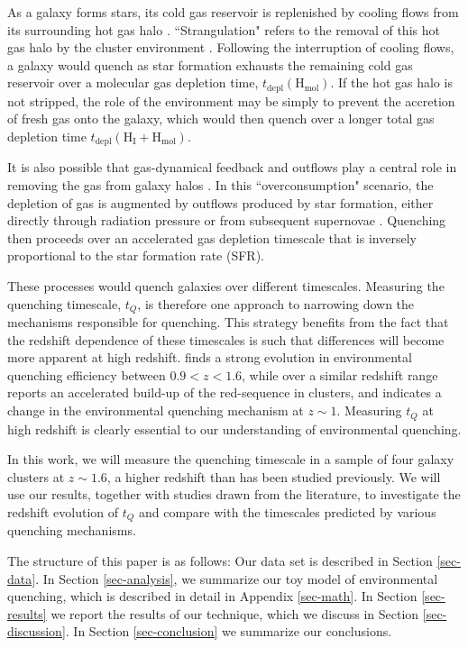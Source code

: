 As a galaxy forms stars, its cold gas reservoir is replenished by cooling flows from its surrounding hot gas halo \citep{Bauermeister:2010aa}.
``Strangulation" refers to the removal of this hot gas halo by the cluster environment \citep{Larson:1980aa,Merritt:1983aa,Byrd:1990aa}.
Following the interruption of cooling flows, a galaxy would quench as star formation exhausts the remaining cold gas reservoir over a molecular gas depletion time, $t_{\mathrm{depl}}(\mathrm{H_{mol}})$.
If the hot gas halo is not stripped, the role of the environment may be simply to prevent the accretion of fresh gas onto the galaxy, which would then quench over a longer total gas depletion time $t_{\mathrm{depl}}(\mathrm{H_I}+\mathrm{H_{mol}})$.

It is also possible that gas-dynamical feedback and outflows play a central role in removing the gas from galaxy halos \citep{McGee:2014aa,Balogh:2016aa}.
In this ``overconsumption" scenario, the depletion of gas is augmented by outflows produced by star formation, either directly through radiation pressure or from subsequent supernovae \citet{McGee:2014aa}.
Quenching then proceeds over an accelerated gas depletion timescale that is inversely proportional to the star formation rate (SFR).

These processes would quench galaxies over different timescales.
Measuring the quenching timescale, $t_Q$, is therefore one approach to narrowing down the mechanisms responsible for quenching.
This strategy benefits from the fact that the redshift dependence of these timescales is such that differences will become more apparent at high redshift.
\citet{Nantais:2016aa,Nantais:2017aa} finds a strong evolution in environmental quenching efficiency between $0.9 < z < 1.6$, while over a similar redshift range \citet{Cerulo:2016aa,Cerulo:2017aa} reports an accelerated build-up of the red-sequence in clusters, and \citet{Balogh:2016aa} indicates a change in the environmental quenching mechanism at $z\sim1$.
Measuring $t_Q$ at high redshift is clearly essential to our understanding of environmental quenching.

In this work, we will measure the quenching timescale in a sample of four galaxy clusters at $z\sim1.6$, a higher redshift than has been studied previously.
We will use our results, together with studies drawn from the literature, to investigate the redshift evolution of $t_Q$ and compare with the timescales predicted by various quenching mechanisms.

The structure of this paper is as follows:
Our data set is described in Section \ref{sec-data}.
In Section \ref{sec-analysis}, we summarize our toy model of environmental quenching, which is described in detail in Appendix \ref{sec-math}.
In Section \ref{sec-results} we report the results of our technique, which we discuss in Section \ref{sec-discussion}.
In Section \ref{sec-conclusion} we summarize our conclusions.

